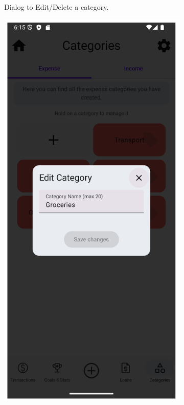 \documentclass[a4paper,12pt]{article}
\begin{document}
\begin{figure}[H]
\begin{subfigure}[b]{0.23\textwidth}
        \caption{Dialog to Edit/Delete a category.}
        \label{fig:category_actions_dialog}
    \end{subfigure}
    \hfill
    \begin{subfigure}[b]{0.23\textwidth}
        \includegraphics[width=\textwidth]{categories_edit_dialog.png}

\end{subfigure}
\end{figure}
\end{document}
